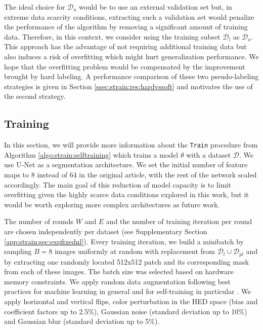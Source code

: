 The ideal choice for $\mathcal{D}_{a}$ would be to use an external validation set but, in extreme data scarcity conditions, extracting such a validation set would penalize the performance of the algorithm by removing a significant amount of training data. Therefore, in this context, we consider using the training subset $\mathcal{D}_l$ as $\mathcal{D}_a$.
This approach has the advantage of not requiring additional training data but also induces a risk of overfitting which might hurt generalization performance. We hope that the overfitting problem would be compensated by the improvement brought by hard labeling. 
A performance comparison of these two pseudo-labeling strategies is given in Section \ref{ssec:strain:res:hardvssoft} and motivates the use of the second strategy.

\subsection{Training}
\label{ssec:strain:training_protocol}

In this section, we will provide more information about the \texttt{Train} procedure from Algorithm \ref{algo:strain:selftraining} which trains a model $\theta$ with a dataset $\mathcal{D}$.
We use U-Net \cite{ronneberger2015unet} as a segmentation architecture. We set the initial number of feature maps to 8 instead of 64 in the original article, with the rest of the network scaled accordingly. The main goal of this reduction of model capacity is to limit overfitting given the highly scarce data conditions explored in this work, but it would be worth exploring more complex architectures as future work.


The number of rounds $W$ and $E$ and the number of training iteration per round are chosen independently per dataset (see Supplementary Section \ref{app:strain:sec:expfixednl}). Every training iteration, we build a minibatch by sampling $B=8$ images uniformly at random with replacement from $\mathcal{D}_l \cup \mathcal{D}_{pl}$ and by extracting one randomly located 512x512 patch and its corresponding mask from each of these images. The batch size was selected based on hardware memory constraints. We apply random data augmentation following best practices for machine learning in general and for self-training in particular \cite{xie2020self,sohn2020fixmatch}. We apply horizontal and vertical flips, color perturbation in the HED space \cite{tellez2018whole} (bias and coefficient factors up to 2.5\%), Gaussian noise (standard deviation up to 10\%) and Gaussian blur (standard deviation up to 5\%). 

